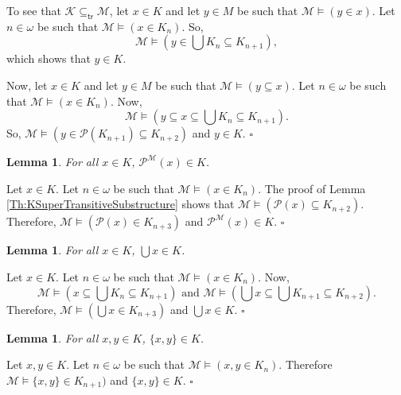 \documentclass[11pt, a4paper]{article}
\newtheorem{lemma}[theorem]{Lemma}
\newenvironment{proof}[1][Proof]{\begin{trivlist}
\item[\hskip \labelsep {\bfseries #1}]}{\end{trivlist}}
\begin{document}
\begin{proof}
To see that $\mathcal{K} \subseteq_{\mathsf{tr}} \mathcal{M}$, let $x \in K$ and let $y \in M$ be such that $\mathcal{M} \models (y \in x)$. Let $n \in \omega$ be such that $\mathcal{M} \models (x \in K_n)$. So,
\[
\mathcal{M} \models \left( y \in \bigcup K_n \subseteq K_{n+1} \right),
\]
which shows that $y \in K$.

Now, let $x \in K$ and let $y \in M$ be such that $\mathcal{M} \models (y \subseteq x)$. Let $n \in \omega$ be such that $\mathcal{M} \models (x \in K_n)$. Now,
\[
\mathcal{M} \models \left( y \subseteq x \subseteq \bigcup K_n \subseteq K_{n+1}\right).
\] 
So, $\mathcal{M} \models (y \in \mathcal{P}(K_{n+1}) \subseteq K_{n+2})$ and $y \in K$. \hfill$\square$ 
\end{proof} 

\begin{lemma} \label{Th:PowersetsInK}
For all $x \in K$, $\mathcal{P}^{\mathcal{M}}(x) \in K$.
\end{lemma}

\begin{proof}
Let $x \in K$. Let $n \in \omega$ be such that $\mathcal{M} \models (x \in K_n)$. The proof of Lemma \ref{Th:KSuperTransitiveSubstructure} shows that $\mathcal{M} \models (\mathcal{P}(x) \subseteq K_{n+2})$. Therefore, $\mathcal{M} \models (\mathcal{P}(x) \in K_{n+3})$ and $\mathcal{P}^{\mathcal{M}}(x) \in K$. \hfill$\square$ 
\end{proof}

\begin{lemma} \label{Th:UnionsInK}
For all $x \in K$, $\bigcup x \in K$.
\end{lemma}

\begin{proof}
Let $x \in K$. Let $n \in \omega$ be such that $\mathcal{M} \models (x \in K_n)$. Now,
\[
\mathcal{M} \models \left( x \subseteq \bigcup K_n \subseteq K_{n+1} \right) \textrm{ and } \mathcal{M} \models \left( \bigcup x \subseteq \bigcup K_{n+1} \subseteq K_{n+2}\right).
\] 
Therefore, $\mathcal{M} \models \left( \bigcup x \in K_{n+3} \right)$ and $\bigcup x \in K$. \hfill$\square$
\end{proof}

\begin{lemma} \label{Th:PairingInK}
For all $x, y \in K$, $\{x, y\} \in K$.
\end{lemma}

\begin{proof}
Let $x, y \in K$. Let $n \in \omega$ be such that $\mathcal{M} \models (x, y \in K_n)$. Therefore $\mathcal{M} \models \{x, y \} \in K_{n+1})$ and $\{x, y\} \in K$. \hfill$\square$
\end{proof}
\end{document}
